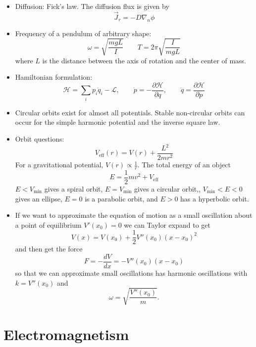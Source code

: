 \documentclass[12pt,a4paper]{book}
\begin{document}
\begin{itemize}
\item Diffusion: Fick's law. The diffusion flux is given by\[
\vec{J}_{r}=-D\nabla_{n}\phi\]

\item Frequency of a pendulum of arbitrary shape:\[
\omega=\sqrt{\frac{mgL}{I}}\qquad T=2\pi\sqrt{\frac{I}{mgL}}\]
where $L$ is the distance between the axis of rotation and the center
of mass.
\item Hamiltonian formulation:\[
\mathcal{H}=\sum_{i}p_{i}\dot{q}_{i}-\mathcal{L},\qquad\dot{p}=-\frac{\partial\mathcal{H}}{\partial q},\qquad\dot{q}=\frac{\partial\mathcal{H}}{\partial p}\]

\item Circular orbits exist for almost all potentials. Stable non-circular
orbits can occur for the simple harmonic potential and the inverse
square law.
\item Orbit questions:\[
V_{\text{eff}}(r)=V(r)+\frac{L^{2}}{2mr^{2}}\]
For a gravitational potential, $V(r)\propto\frac{1}{r}$. The total
energy of an object\[
E=\frac{1}{2}mv^{2}+V_{\text{eff}}\]
$E<V_{\text{min}}$ gives a spiral orbit, $E=V_{\text{min}}$ gives
a circular orbit,, $V_{\text{min}}<E<0$ gives an ellipse, $E=0$
is a parabolic orbit, and $E>0$ has a hyperbolic orbit.
\item If we want to approximate the equation of motion as a small oscillation
about a point of equilibrium $V'(x_{0})=0$ we can Taylor expand to
get\[
V(x)=V(x_{0})+\frac{1}{2}V''(x_{0})(x-x_{0})^{2}\]
and then get the force \[
F=-\frac{dV}{dx}=-V''(x_{0})(x-x_{0})\]
so that we can approximate small oscillations has harmonic oscillations
with $k=V''(x_{0})$ and\[
\omega=\sqrt{\frac{V''(x_{0})}{m}}.\]

\end{itemize}



















\chapter{Electromagnetism}
\end{document}
